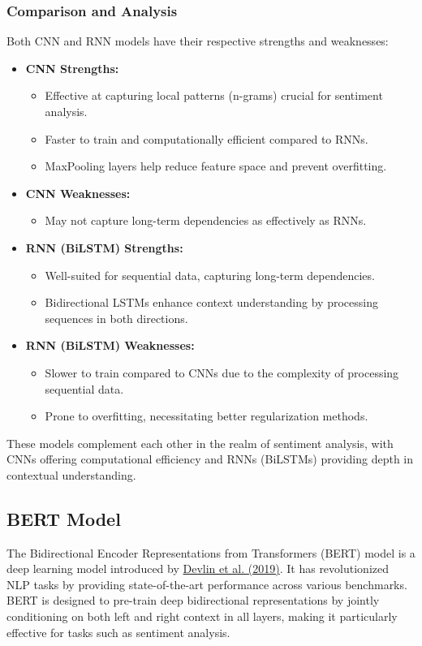 \documentclass[12pt]{article}
\begin{document}
\subsubsection{Comparison and Analysis}
Both CNN and RNN models have their respective strengths and weaknesses:
\begin{itemize}
    \item \textbf{CNN Strengths:}
    \begin{itemize}
        \item Effective at capturing local patterns (n-grams) crucial for sentiment analysis.
        \item Faster to train and computationally efficient compared to RNNs.
        \item MaxPooling layers help reduce feature space and prevent overfitting.
    \end{itemize}
    \item \textbf{CNN Weaknesses:}
    \begin{itemize}
        \item May not capture long-term dependencies as effectively as RNNs.
    \end{itemize}
    \item \textbf{RNN (BiLSTM) Strengths:}
    \begin{itemize}
        \item Well-suited for sequential data, capturing long-term dependencies.
        \item Bidirectional LSTMs enhance context understanding by processing sequences in both directions.
    \end{itemize}
    \item \textbf{RNN (BiLSTM) Weaknesses:}
    \begin{itemize}
        \item Slower to train compared to CNNs due to the complexity of processing sequential data.
        \item Prone to overfitting, necessitating better regularization methods.
    \end{itemize}
\end{itemize}

These models complement each other in the realm of sentiment analysis, with CNNs offering computational efficiency and RNNs (BiLSTMs) providing depth in contextual understanding.


\subsection{BERT Model}
The Bidirectional Encoder Representations from Transformers (BERT) model is a deep learning model introduced by \href{https://arxiv.org/abs/1810.04805}{Devlin et al. (2019)}. It has revolutionized NLP tasks by providing state-of-the-art performance across various benchmarks. BERT is designed to pre-train deep bidirectional representations by jointly conditioning on both left and right context in all layers, making it particularly effective for tasks such as sentiment analysis.
\end{document}
